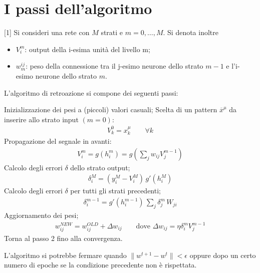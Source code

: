 
\newpage

\section{I passi dell'algoritmo} %
\label{sec:l'algoritmo}

\algrenewcommand{\alglinenumber}[1]{\scriptsize{}}%
Si consideri una rete con $M$ strati e $m=0,\dots,M$. Si denota inoltre
\begin{itemize}
    \item $V^m_i$: output della i-esima unità del livello m;
    \item $w^{ij}_m$: peso della connessione tra il j-esimo neurone dello strato $m-1$ e l'i-esimo neurone dello strato $m$. 
\end{itemize}
L'algoritmo di retroazione si compone dei seguenti passi:
\begin{algorithmic}[1]%
    \State Inizializzazione dei pesi a (piccoli) valori casuali;
    \State Scelta di un pattern $\overline{x}^\mu$ da inserire allo strato input $(m=0)$:
    \begin{align*}
        V^0_k = x^\mu_k \qquad \forall k
    \end{align*}
    \State Propagazione del segnale in avanti:
    \begin{align*}
        V^m_i = g(h_i^m) = g\left(\sum_j w_{ij} V_j^{m-1}\right)
    \end{align*}
    \State Calcolo degli errori $\delta$ dello strato output;
    \begin{align*}
        \delta^M_i = (y^M_i - V^M_i) \, g'(h^M_i)
    \end{align*}
    \State Calcolo degli errori $\delta$ per tutti gli strati precedenti;
    \begin{align*}
        \delta^{m-1}_i = g'\left(h^{m-1}_i\right) \, \sum_j \delta^m_j \, W_{ji}
    \end{align*}
    \State Aggiornamento dei pesi;
    \begin{align*}
        w^{NEW}_{ij} = w^{OLD}_{ij} + \Delta w_{ij} \qquad \text{dove } \Delta w_{ij} = \eta \delta_i^m V_j^{m-1} 
    \end{align*}
    \State Torna al passo 2 fino alla convergenza.
\end{algorithmic}
L'algoritmo si potrebbe fermare quando $\| w^{t+1} - w^t \| < \epsilon$ oppure dopo un certo numero di epoche se la condizione precedente non è rispettata.

